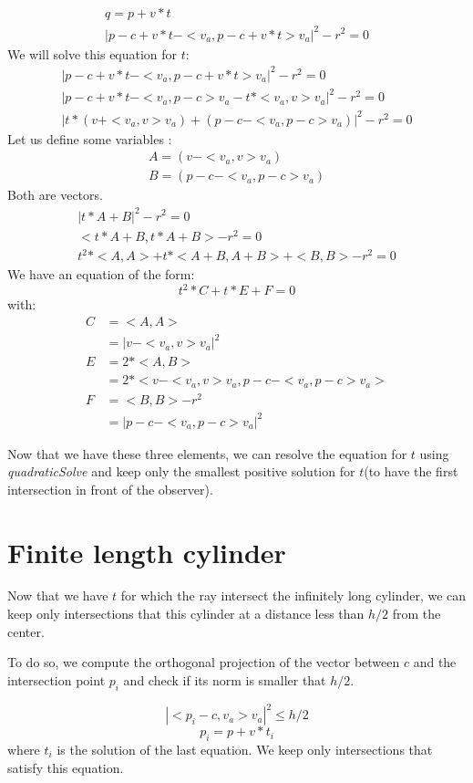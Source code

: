 \documentclass{article}
\begin{document}
\begin{gather*}
    q=p+v*t \\
    |p-c+v*t-<v_a, p-c+v*t>v_a|^2-r^2=0
\end{gather*}
We will solve this equation for $t$:
\begin{gather*}
    |p-c+v*t-<v_a, p-c+v*t>v_a|^2-r^2=0\\
    |p-c+v*t - <v_a, p-c>v_a - t*<v_a, v>v_a|^2 -r^2=0\\
    |t*(v+<v_a, v>v_a) + (p-c- <v_a, p-c>v_a)|^2 -r^2 = 0
\end{gather*}
Let us define some variables :
\begin{gather*}
    A = (v-<v_a, v>v_a)\\
    B = (p-c- <v_a, p-c>v_a)
\end{gather*}
Both are vectors.
\begin{gather*}
    |t*A + B|^2 -r^2 = 0\\
    <t*A+B, t*A+B> -r^2 = 0\\
    t^2 * <A,A> + t*<A+B, A+B> + <B,B> -r^2 = 0
\end{gather*}
We have an equation of the form:
$$t^2*C + t*E + F = 0$$
with:
\begin{align*}
    C &= <A,A> \\ 
    &= |v-<v_a, v>v_a|^2\\
    E &= 2*<A, B> \\
    &= 2*<v-<v_a, v>v_a, p-c- <v_a, p-c>v_a>\\
    F &= <B,B> -r^2 \\
    &= |p-c- <v_a, p-c>v_a|^2
\end{align*}


Now that we have these three elements, we can resolve the equation for $t$ using \textit{quadraticSolve} and keep only the smallest positive solution for $t$(to have the first intersection in front of the observer).

\section{Finite length cylinder}
Now that we have $t$ for which the ray intersect the infinitely long cylinder, we can keep only intersections that this cylinder at a distance less than $h/2$ from the center.

To do so, we compute the orthogonal projection of the vector between $c$ and the intersection point $p_i$ and check if its norm is smaller that $h/2$.

$$|<p_i-c, v_a>v_a|^2 \leq h/2$$
$$p_i = p+v*t_i$$
where $t_i$ is the solution of the last equation. We keep only intersections that satisfy this equation.
\end{document}
